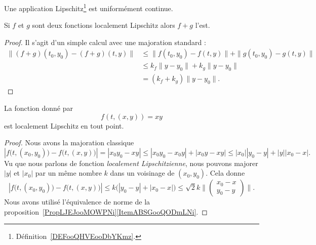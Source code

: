 \begin{proposition} \label{PROPooVZSAooUneOQK}
    Une application Lipschitz\footnote{Définition~\ref{DEFooQHVEooDbYKmz}.} est uniformément continue.
\end{proposition}

\begin{proposition}     \label{PropGIBZooVsIqfY}
    Si \( f\) et \( g\) sont deux fonctions localement Lipschitz alors \( f+g\) l'est.
\end{proposition}

\begin{proof}
    Il s'agit d'un simple calcul avec une majoration standard :
    \begin{subequations}
        \begin{align}
            \| (f+g)(t_0,y_0)-(f+g)(t,y) \|&\leq \|  f(t_0,y_0)-f(t,y)  \|+\| g(t_0,y_0)-g(t,y) \|\\
            &\leq k_f\| y-y_0 \|+k_g\| y-y_0 \|\\
            &=(k_f+k_g)\| y-y_0 \|.
        \end{align}
    \end{subequations}
\end{proof}

\begin{lemma}   \label{LemCFZUooVqZmpc}
    La fonction donné par
    \begin{equation}
        f(t, (x,y) )=xy
    \end{equation}
    est localement Lipschitz en tout point.
\end{lemma}

\begin{proof}
    Nous avons la majoration classique
    \begin{equation}
        | f\big(t,(x_0,y_0)\big)-f\big( t,(x,y) \big) |=| x_0y_0-xy |\leq| x_0y_0-x_0y |+| x_0y-xy |\leq | x_0 || y_0-y |+| y || x_0-x |.
    \end{equation}
    Vu que nous parlons de fonction \emph{localement Lipschitzienne}, nous pouvons majorer \( | y |\) et \( | x_0 |\) par un même nombre \( k\) dans un voisinage de \( (x_0,y_0)\). Cela donne
    \begin{equation}
        | f\big(t,(x_0,y_0)\big)-f\big( t,(x,y) \big) |\leq k\big( | y_0-y |+| x_0-x | \big)\leq \sqrt{2}k\| \begin{pmatrix}
            x_0-x    \\
            y_0-y
        \end{pmatrix}\|.
    \end{equation}
    Nous avons utilisé l'équivalence de norme de la proposition~\ref{PropLJEJooMOWPNi}\ref{ItemABSGooQODmLNi}.
\end{proof}


